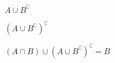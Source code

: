 $A \cup B^\complement$\\
\begin{venndiagram2sets}[shade=skyblue,labelNotAB={$\mathcal{U}$}]
	\fillA \fillNotAorB
\end{venndiagram2sets}

$(A \cup B^\complement)^\complement$\\
\begin{venndiagram2sets}[shade=skyblue,labelNotAB={$\mathcal{U}$}]
	\fillOnlyB
\end{venndiagram2sets}

$(A \cap B) \cup (A \cup B^\complement)^\complement = B$\\
\begin{venndiagram2sets}[shade=skyblue,labelNotAB={$\mathcal{U}$}]
	\fillB
\end{venndiagram2sets}
